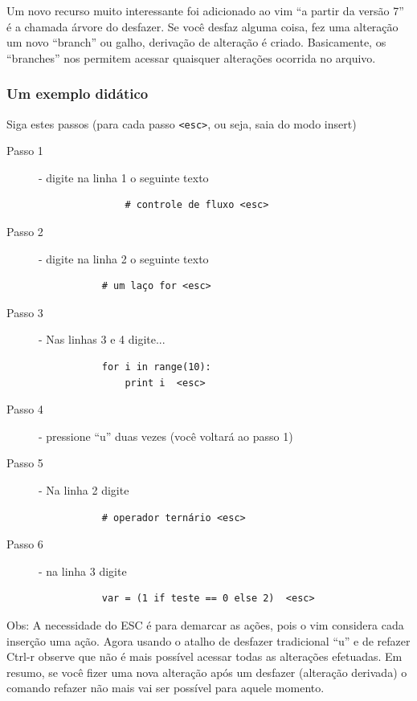 \documentclass[10pt,a4paper,openany]{book}
\begin{document}
Um novo recurso muito interessante foi adicionado ao vim ``a partir da
versão 7''  é a chamada árvore do desfazer.  Se
você desfaz alguma coisa, fez uma alteração um novo ``branch'' ou
galho, derivação de alteração é criado.  Basicamente, os ``branches''
nos permitem acessar quaisquer alterações ocorrida no arquivo.

\subsubsection{Um exemplo didático}
\label{Um exemplo didático}

Siga estes passos (para cada passo \verb|<esc>|, ou seja, saia do modo
insert)


\begin{description}
\item [Passo 1] - digite na linha 1 o seguinte texto
\begin{verbatim}
			   # controle de fluxo <esc>
\end{verbatim}

\item [Passo 2] - digite na linha 2 o seguinte texto
\begin{verbatim}
		   # um laço for <esc>
\end{verbatim}

\item [Passo 3] - Nas linhas 3 e 4 digite...

\begin{verbatim}
		   for i in range(10):
			   print i  <esc>
\end{verbatim}

\item [Passo 4] - pressione ``u'' duas vezes (você voltará ao passo 1)
\item [Passo 5] - Na linha 2 digite

\begin{verbatim}
		   # operador ternário <esc>
\end{verbatim}

\item [Passo 6] - na linha 3 digite

\begin{verbatim}
		   var = (1 if teste == 0 else 2)  <esc>
\end{verbatim}

\end{description}

Obs: A necessidade do ESC é para demarcar as ações, pois o vim
considera cada inserção uma ação.  Agora usando o atalho de desfazer
tradicional ``u'' e de refazer Ctrl-r observe que não é mais possível
acessar todas as alterações efetuadas. Em resumo, se você fizer uma
nova alteração após um desfazer (alteração derivada) o comando refazer
não mais vai ser possível para aquele momento. \\
\end{document}
